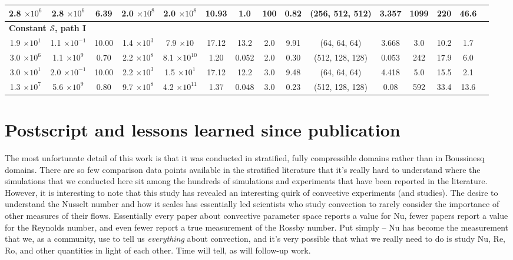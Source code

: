 \begin{table}
\begin{center}
{\begin{tabular}{c c c c c c c c c c c c c c c}
2.8	$\times 10^{	6	}$	&	2.8	$\times 10^{	6	}$	&	6.39	&	2.0	$\times 10^{	8	}$	&	2.0	$\times 10^{	8	}$	&	10.93	&	1.0	&	100	&	0.82	&	(256,		512,		512)	&	3.357	&	1099	&	220	&	46.6	\\				
\hline																																															
\multicolumn{3}{l}{\textbf{Constant $\mathcal{S}$, path I}}\\
1.9	$\times 10^{	1	}$	&	1.1	$\times 10^{	-1	}$	&	10.00	&	1.4	$\times 10^{	3	}$	&	7.9	$\times 10^{		}$	&	17.12	&	13.2	&	2.0	&	9.91	&	(64,		64,		64)	&	3.668	&	3.0	&	10.2	&	1.7	\\				
3.0	$\times 10^{	6	}$	&	1.1	$\times 10^{	9	}$	&	0.70	&	2.2	$\times 10^{	8	}$	&	8.1	$\times 10^{	10	}$	&	1.20	&	0.052	&	2.0	&	0.30	&	(512,		128,		128)	&	0.053	&	242	&	17.9	&	6.0	\\				
3.0	$\times 10^{	1	}$	&	2.0	$\times 10^{	-1	}$	&	10.00	&	2.2	$\times 10^{	3	}$	&	1.5	$\times 10^{	1	}$	&	17.12	&	12.2	&	3.0	&	9.48	&	(64,		64,		64)	&	4.418	&	5.0	&	15.5	&	2.1	\\				
1.3	$\times 10^{	7	}$	&	5.6	$\times 10^{	9	}$	&	0.80	&	9.7	$\times 10^{	8	}$	&	4.2	$\times 10^{	11	}$	&	1.37	&	0.048	&	3.0	&	0.23	&	(512,		128,		128)	&	0.08	&	592	&	33.4	&	13.6	\\				
\hline																																														
\end{tabular}
}
\end{center}
\end{table}



\newpage
\section{Postscript and lessons learned since publication}
\label{sec:ro_p19_postscript}
The most unfortunate detail of this work is that it was conducted in stratified, fully compressible domains rather than in Boussinesq domains.
There are so few comparison data points available in the stratified literature that it's really hard to understand where the simulations that we conducted here sit among the hundreds of simulations and experiments that have been reported in the \RB literature.
However, it is interesting to note that this study has revealed an interesting quirk of convective experiments (and studies).
The desire to understand the Nusselt number and how it scales has essentially led scientists who study convection to rarely consider the importance of other measures of their flows.
Essentially every paper about convective parameter space reports a value for Nu, fewer papers report a value for the Reynolds number, and even fewer report a true measurement of the Rossby number.
Put simply -- Nu has become the measurement that we, as a community, use to tell us \emph{everything} about convection, and it's very possible that what we really need to do is study Nu, Re, Ro, and other quantities in light of each other.
Time will tell, as will follow-up work.

